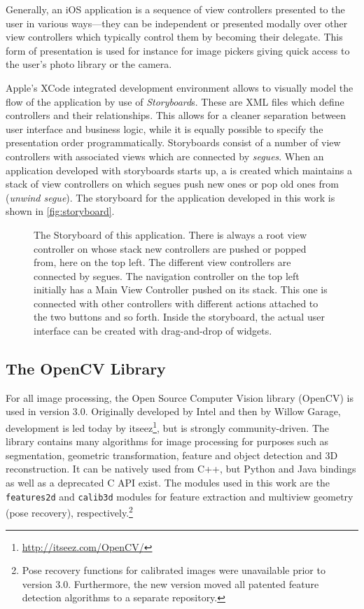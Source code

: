 Generally, an iOS application is a sequence of view controllers presented to the
user in various ways---they can be independent or presented modally over other
view controllers which typically control them by becoming their delegate. This
form of presentation is used for instance for image pickers giving quick access
to the user's photo library or the camera.

Apple's XCode integrated development environment allows to visually model the
flow of the application by use of \emph{Storyboard}s. These are XML files which
define controllers and their relationships.  This allows for a cleaner
separation between user interface and business logic, while it is equally
possible to specify the presentation order programmatically.  Storyboards
consist of a number of view controllers with associated views which are
connected by \emph{segues}. When an application developed with storyboards
starts up, a  is created which maintains a stack of
view controllers on which segues push new ones or pop old ones from (\emph{unwind
segue}). The storyboard for the application developed in this work is shown in
\autoref{fig:storyboard}.

\begin{figure}[h]
   {\centering      
      
      \caption[Storyboard example]{The Storyboard of this application. There is
      always a root view controller on whose stack new controllers are pushed or
   popped from, here on the top left. The different view controllers are
connected by segues. The navigation controller on the top left initially has a
Main View Controller pushed on its stack. This one is connected with other
controllers with different actions attached to the two buttons and so forth.
Inside the storyboard, the actual user interface can be created with
drag-and-drop of widgets.}
   \label{fig:storyboard}}
\end{figure}

\FloatBarrier

\subsection{The OpenCV Library}

For all image processing, the Open Source Computer Vision library (OpenCV) is
used in version 3.0. Originally developed by Intel and then by Willow Garage,
development is led today by itseez\footnote{\url{http://itseez.com/OpenCV/}},
but is strongly community-driven. The library contains many algorithms for image
processing for purposes such as segmentation, geometric transformation, feature
and object detection and 3D reconstruction. It can be natively used from C++,
but Python and Java bindings as well as a deprecated C API exist.  The modules
used in this work are the \texttt{features2d} and \texttt{calib3d} modules for
feature extraction and multiview geometry (pose recovery), respectively.\footnote{Pose recovery
   functions for calibrated images were unavailable prior to version 3.0.
Furthermore, the new version moved all patented feature detection algorithms to a separate
repository.}

